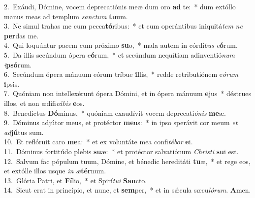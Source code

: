 {2.~}Exáudi, Dómine, vocem deprecatiónis meæ dum oro \textbf{ad} te:~* dum extóllo manus meas ad templum \textit{san}\textit{ctum} \textbf{tu}um.\\
{3.~}Ne simul trahas me cum pecca\textbf{tó}ribus:~* et cum operántibus iniquitá\textit{tem} \textit{ne} \textbf{per}das me.\\
{4.~}Qui loquúntur pacem cum próximo \textbf{su}o,~* mala autem in córdi\textit{bus} \textit{e}\textbf{ó}rum.\\
{5.~}Da illis secúndum ópera e\textbf{ó}rum,~* et secúndum nequítiam adinventió\textit{num} \textit{i}\textbf{psó}rum.\\
{6.~}Secúndum ópera mánuum eórum tríbue \textbf{il}lis,~* redde retributiónem e\textit{ó}\textit{rum} \textbf{i}psis.\\
{7.~}Quóniam non intellexérunt ópera Dómini, et in ópera mánuum \textbf{e}jus~* déstrues illos, et non ædifi\textit{cá}\textit{bis} \textbf{e}os.\\
{8.~}Benedíctus \textbf{Dó}minus,~* quóniam exaudívit vocem deprecati\textit{ó}\textit{nis} \textbf{me}æ.\\
{9.~}Dóminus adjútor meus, et protéctor \textbf{me}us:~* in ipso sperávit cor meum \textit{et} \textit{ad}\textbf{jú}tus sum.\\
{10.~}Et reflóruit caro \textbf{me}a:~* et ex voluntáte mea confi\textit{té}\textit{bor} \textbf{e}i.\\
{11.~}Dóminus fortitúdo plebis \textbf{su}æ:~* et protéctor salvatiónum \textit{Chri}\textit{sti} \textbf{su}i est.\\
{12.~}Salvum fac pópulum tuum, Dómine, et bénedic hereditáti \textbf{tu}æ,~* et rege eos, et extólle illos usque \textit{in} \textit{æ}\textbf{tér}num.\\
{13.~}Glória Patri, et \textbf{Fí}lio,~* et Spirí\textit{tu}\textit{i} \textbf{San}cto.\\
{14.~}Sicut erat in princípio, et nunc, et \textbf{sem}per,~* et in sǽcula sæcu\textit{ló}\textit{rum}. \textbf{A}men.\\

